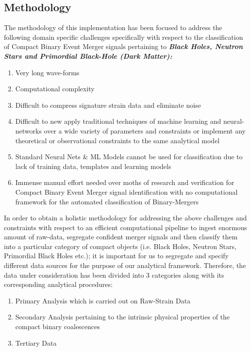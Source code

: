     \subsection{Methodology}
    The methodology of this implementation has been focused to address the following domain specific challenges specifically with respect to the classification of Compact Binary Event Merger signals pertaining to \textbf{\textit{Black Holes, Neutron Stars and Primordial Black-Hole (Dark Matter):}}

    \begin{enumerate}
        \item {Very long wave-forms}
        \item {Computational complexity}
        \item {Difficult to compress signature strain data and eliminate noise}
        \item {Difficult to new apply traditional techniques of machine learning and neural-networks over a wide variety of parameters and constraints or implement any theoretical or observational constraints to the same analytical model}
        \item {Standard Neural Nets \& ML Models cannot be used for classification due to lack of training data, templates and learning models}
        \item {Immense manual effort needed over moths of research and verification for Compact Binary Event Merger signal identification with no computational framework for the automated classification of Binary-Mergers}
    \end{enumerate}

    In order to obtain a holistic methodology for addressing the above challenges and constraints with respect to an efficient computational pipeline to ingest enormous amount of raw-data, segregate confident merger signals and then classify them into a particular category of compact objects (i.e. Black Holes, Neutron Stars, Primordial Black Holes etc.); it is important for us to segregate and specify different data sources for the purpose of our analytical framework. Therefore, the data under consideration has been divided into 3 categories along with its corresponding analytical procedures:
    \begin{enumerate}
        \item Primary Analysis which is carried out on Raw-Strain Data
        \item Secondary Analysis pertaining to the intrinsic physical properties of the compact binary coalescences
        \item Tertiary Data
    \end{enumerate}

